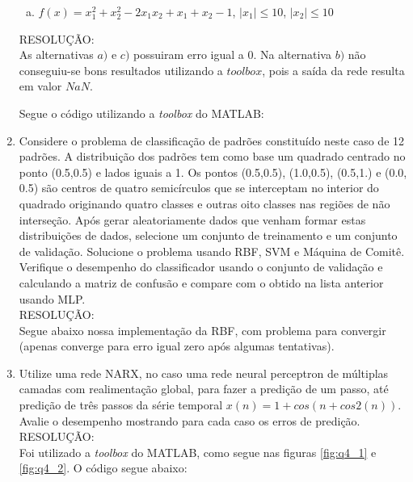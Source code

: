 \documentclass[a4paper,oneside,12pt]{article}
\begin{document}
\begin{enumerate}[1.]
\begin{enumerate}[a)]
\item $f(x) = x_{1}^{2} + x_{2}^{2} - 2 x_{1} x_{2} + x_{1} + x_{2} - 1$, $|x_{1}| \leq 10$, $|x_{2}| \leq 10$
\end{enumerate}

RESOLU\c{C}\~AO: \\

As alternativas $a)$ e $c)$ possuiram erro igual a $0$. Na alternativa $b)$ n\~ao conseguiu-se bons resultados utilizando a $toolbox$, pois a sa\'ida da rede resulta em valor $NaN$.

Segue o c\'odigo utilizando a \emph{toolbox} do MATLAB:



\item Considere o problema de classifica\c{c}\~ao de padr\~oes constitu\'ido neste caso de 12 padr\~oes. A distribui\c{c}\~ao dos padr\~oes tem como base um quadrado centrado no ponto (0.5,0.5) e lados iguais a 1. Os pontos (0.5,0.5), (1.0,0.5), (0.5,1.) e (0.0, 0.5) s\~ao centros de quatro semic\'irculos que se interceptam no interior do quadrado originando quatro classes e outras oito classes nas regi\~oes de n\~ao interse\c{c}\~ao. Ap\'os gerar aleatoriamente dados que venham formar estas distribui\c{c}\~oes de dados, selecione um conjunto de treinamento e um conjunto de valida\c{c}\~ao. Solucione o problema usando RBF, SVM e M\'aquina de Comit\^e. Verifique o desempenho do classificador usando o conjunto de valida\c{c}\~ao e calculando a matriz de confus\~ao e compare com o obtido na lista anterior usando MLP. \\

RESOLU\c{C}\~AO: \\

Segue abaixo nossa implementa\c{c}\~ao da RBF, com problema para convergir (apenas converge para erro igual zero ap\'os algumas tentativas).



\item Utilize uma rede NARX, no caso uma rede neural perceptron de m\'ultiplas camadas com realimenta\c{c}\~ao global, para fazer a predi\c{c}\~ao de um passo, at\'e predi\c{c}\~ao de tr\^es passos da s\'erie temporal $x(n) = 1 + cos(n + cos 2 (n))$. Avalie o desempenho mostrando para cada caso os erros de predi\c{c}\~ao. \\

RESOLU\c{C}\~AO: \\

Foi utilizado a \emph{toolbox} do MATLAB, como segue nas figuras \ref{fig:q4_1} e \ref{fig:q4_2}. O c\'odigo segue abaixo:


\end{enumerate}
\end{document}
